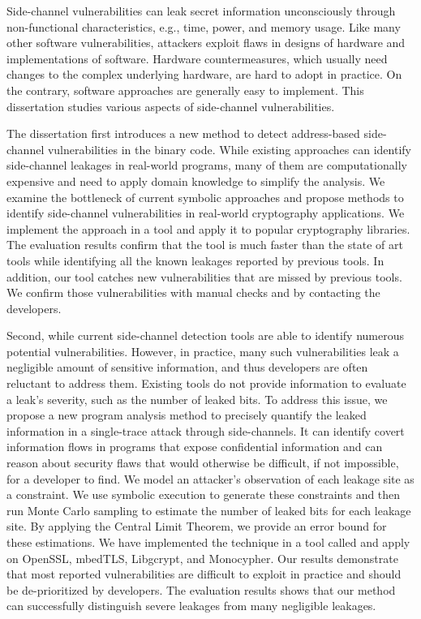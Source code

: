 
Side-channel vulnerabilities can leak secret information unconsciously through non-functional characteristics, e.g., time, power, and memory usage. Like many other software vulnerabilities, attackers exploit flaws in designs of hardware and implementations of software. Hardware countermeasures, which usually need changes to the complex underlying hardware, are hard to adopt in practice. On the contrary, software approaches are generally easy to implement. This dissertation studies various aspects of side-channel vulnerabilities.

The dissertation first introduces a new method to detect address-based side-channel vulnerabilities in the binary code. While existing approaches can identify side-channel leakages in real-world programs, many of them are computationally expensive and need to apply domain knowledge to simplify the analysis.  We examine the bottleneck of current symbolic approaches and propose methods to identify side-channel vulnerabilities in real-world cryptography applications. We implement the approach in a tool and apply it to popular cryptography libraries. The evaluation results confirm that the tool is much faster than the state of art tools while identifying all the known leakages reported by previous tools. In addition, our tool catches new vulnerabilities that are missed by previous tools. We confirm those vulnerabilities with manual checks and by contacting the developers.

Second, while current side-channel detection tools are able to identify numerous potential vulnerabilities. However, in practice, many such vulnerabilities leak a negligible amount of sensitive information, and thus developers are often reluctant to address them. Existing tools do not provide information to evaluate a leak’s severity, such as the number of leaked bits. To address this issue, we propose a new program analysis method to precisely quantify the leaked information in a single-trace attack through side-channels. It can identify covert information flows in programs that expose confidential information and can reason about security flaws that would otherwise be difficult, if not impossible, for a developer to find. We model an attacker’s observation of each leakage site as a constraint. We use symbolic execution to generate these constraints and then run Monte Carlo sampling to estimate the number of leaked bits for each leakage site. By applying the Central Limit Theorem, we provide an error bound for these estimations. We have implemented the technique in a tool called \tool{} and apply \tool{} on OpenSSL, mbedTLS, Libgcrypt, and Monocypher. Our results demonstrate that most reported vulnerabilities are difficult to exploit in practice and should be de-prioritized by developers. The evaluation results shows that our method can successfully distinguish severe leakages from many negligible leakages. 


